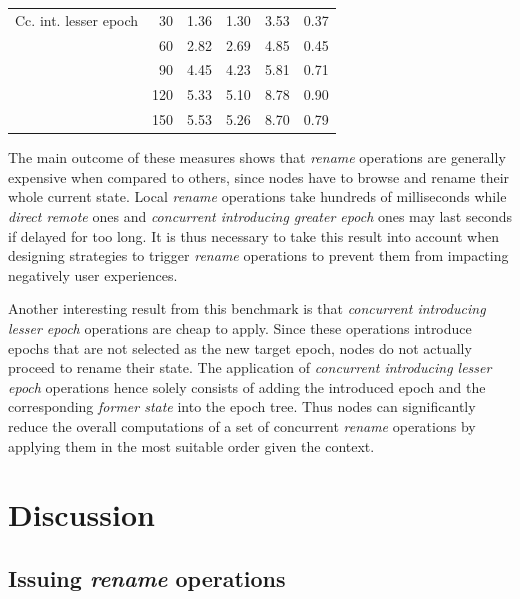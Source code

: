 \documentclass[10pt,journal,compsoc]{IEEEtran}
\begin{document}
\begin{table}[!ht]
{\begin{tabular}{lrrrrr}
            \cmidrule(lr){1-6}
            Cc. int. lesser epoch & 30  &     1.36 &     1.30 &       3.53 &   0.37 \\
                                    & 60  &     2.82 &     2.69 &       4.85 &   0.45 \\
                                    & 90  &     4.45 &     4.23 &       5.81 &   0.71 \\
                                    & 120 &     5.33 &     5.10 &       8.78 &   0.90 \\
                                    & 150 &     5.53 &     5.26 &       8.70 &   0.79 \\
            \bottomrule
        \end{tabular}
    }
\end{table}

The main outcome of these measures shows that \emph{rename} operations are generally expensive when compared to others, since nodes have to browse and rename their whole current state.
Local \emph{rename} operations take hundreds of milliseconds while \emph{direct remote} ones and \emph{concurrent introducing greater epoch} ones may last seconds if delayed for too long.
It is thus necessary to take this result into account when designing strategies to trigger \emph{rename} operations to prevent them from impacting negatively user experiences.

Another interesting result from this benchmark is that \emph{concurrent introducing lesser epoch} operations are cheap to apply.
Since these operations introduce epochs that are not selected as the new target epoch, nodes do not actually proceed to rename their state.
The application of \emph{concurrent introducing lesser epoch} operations hence solely consists of adding the introduced epoch and the corresponding \emph{former state} into the epoch tree.
Thus nodes can significantly reduce the overall computations of a set of concurrent \emph{rename} operations by applying them in the most suitable order given the context.

\section{Discussion}

\label{sec:discussion}

\subsection{Issuing \emph{rename} operations}
\label{sec:issuing-rename-operations}
\end{document}
